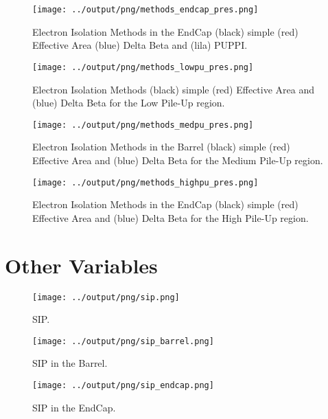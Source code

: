 \documentclass[11pt]{book}
\begin{document}
\begin{figure}[ht]
\centering
\texttt{[image: ../output/png/methods\_endcap\_pres.png]}
\caption{Electron Isolation Methods in the EndCap (black) simple (red) Effective Area (blue) Delta Beta and (lila) PUPPI.}
\label{fig:methods_endcap_pres}
\end{figure}


\begin{figure}[ht]
\centering
\texttt{[image: ../output/png/methods\_lowpu\_pres.png]}
\caption{Electron Isolation Methods (black) simple (red) Effective Area and (blue) Delta Beta for the Low Pile-Up region.}
\label{fig:methods_lowpu_pres}
\end{figure}

\begin{figure}[ht]
\centering
\texttt{[image: ../output/png/methods\_medpu\_pres.png]}
\caption{Electron Isolation Methods in the Barrel (black) simple (red) Effective Area and (blue) Delta Beta for the Medium Pile-Up region.}
\label{fig:methods_medpu_pres}
\end{figure}

\begin{figure}[ht]
\centering
\texttt{[image: ../output/png/methods\_highpu\_pres.png]}
\caption{Electron Isolation Methods in the EndCap (black) simple (red) Effective Area and (blue) Delta Beta for the High Pile-Up region.}
\label{fig:methods_highpu_pres}
\end{figure}


\chapter{Other Variables}
\begin{figure}[ht]
\centering
\texttt{[image: ../output/png/sip.png]}
\caption{SIP.}
\label{fig:sip}
\end{figure}

\begin{figure}[ht]
\centering
\texttt{[image: ../output/png/sip\_barrel.png]}
\caption{SIP in the Barrel.}
\label{fig:sip_barrel}
\end{figure}

\begin{figure}[ht]
\centering
\texttt{[image: ../output/png/sip\_endcap.png]}
\caption{SIP in the EndCap.}
\label{fig:sip_endcap}
\end{figure}
\end{document}

